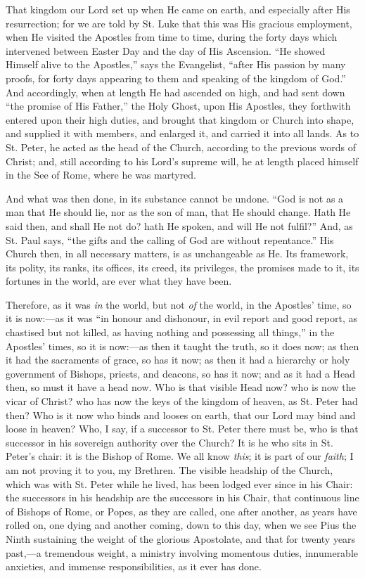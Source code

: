 That kingdom our Lord set up when He came on earth,
and especially after His resurrection; for we are told by
St. Luke that this was His gracious employment, when He
visited the Apostles from time to time, during the forty
days which intervened between Easter Day and the day of
His Ascension. ``He showed Himself alive to the
Apostles,'' says the Evangelist, ``after His
passion by many proofs, for forty days appearing to them
and speaking of the kingdom of God.'' And
accordingly, when at length He had ascended on high, and
had sent down ``the promise of His Father,'' the
Holy Ghost, upon His Apostles, they forthwith entered
upon their high duties, and brought that kingdom or
Church into shape, and supplied it with members, and
enlarged it, and carried it into all lands. As to St.
Peter, he acted as the head of the Church, according to
the previous words of Christ; and, still according to his
Lord's supreme will, he at length placed himself in the
See of Rome, where he was martyred.

And what was then done, in its substance cannot be
undone. ``God is not as a man that He should lie, nor
as the son of man, that He should change. Hath He said
then, and shall He not do? hath He spoken, and will He
not fulfil?'' And, as St. Paul says, ``the gifts
and the calling of God are without repentance.'' His
Church then, in all necessary matters, is as unchangeable
as He. Its framework, its polity, its ranks, its offices,
its creed, its privileges, the promises made to it, its
fortunes in the world, are ever what they have been.

Therefore, as it was \emph{in} the world, but not \emph{of}
the world, in the Apostles' time, so it is now:—as
it was ``in honour and dishonour, in evil report and
good report, as chastised but not killed, as having
nothing and possessing all things,'' in the Apostles'
times, so it is now:—as then it taught the truth, so
it does now; as then it had the sacraments of grace, so
has it now; as then it had a hierarchy or holy government
of Bishops, priests, and deacons, so has it now; and as
it had a Head then, so must it have a head now. Who is
that visible Head now? who is now the vicar of Christ?
who has now the keys of the kingdom of heaven, as St.
Peter had then? Who is it now who binds and looses on
earth, that our Lord may bind and loose in heaven? Who, I
say, if a successor to St. Peter there must be, who is
that successor in his sovereign authority over the
Church? It is he who sits in St. Peter's chair: it is the
Bishop of Rome. We all know \emph{this}; it is part of
our \emph{faith}; I am not proving it to you, my
Brethren. The visible headship of the Church, which was
with St. Peter while he lived, has been lodged ever since
in his Chair: the successors in his headship are the
successors in his Chair, that continuous line of Bishops
of Rome, or Popes, as they are called, one after another,
as years have rolled on, one dying and another coming,
down to this day, when we see Pius the Ninth sustaining
the weight of the glorious Apostolate, and that for
twenty years past,—a tremendous weight, a ministry
involving momentous duties, innumerable anxieties, and
immense responsibilities, as it ever has done.

